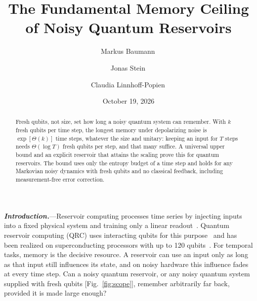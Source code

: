 \documentclass[aps,prl,twocolumn,superscriptaddress,floatfix]{revtex4-2}
\theoremstyle{plain}
\newcommand{\runin}[1]{\textit{\textbf{#1}}---}
\begin{document}
\let\SMaddcontentsline\addcontentsline
\renewcommand{\addcontentsline}[3]{}

\title{The Fundamental Memory Ceiling of Noisy Quantum Reservoirs}

\author{Markus Baumann\,}
\author{Jonas Stein\,}
\author{Claudia Linnhoff-Popien\,}

\date{October 19, 2026}

\begin{abstract}
Fresh qubits, not size, set how long a noisy quantum system can remember. With $k$ fresh qubits per time step, the longest memory under depolarizing noise is $\exp[\Theta(k)]$ time steps, whatever the size and unitary: keeping an input for $T$ steps needs $\Theta(\log T)$ fresh qubits per step, and that many suffice. A universal upper bound and an explicit reservoir that attains the scaling prove this for quantum reservoirs. The bound uses only the entropy budget of a time step and holds for any Markovian noisy dynamics with fresh qubits and no classical feedback, including measurement-free error correction.
\end{abstract}

\maketitle


\runin{Introduction.}Reservoir computing processes time series by injecting inputs into a fixed physical system and training only a linear readout~\cite{Jaeger2001,Maass2002,JaegerHaas2004,Lukosevicius2009,Tanaka2019}. Quantum reservoir computing (QRC) uses interacting qubits for this purpose~\cite{Fujii2017,Nakajima2019,Mujal2021} and has been realized on superconducting processors with up to 120 qubits~\cite{Chen2020,Suzuki2022,Yasuda2023,Hu2024,Monzani2024}. For temporal tasks, memory is the decisive resource. A reservoir can use an input only as long as that input still influences its state, and on noisy hardware this influence fades at every time step. Can a noisy quantum reservoir, or any noisy quantum system supplied with fresh qubits [Fig.~\ref{fig:scope}], remember arbitrarily far back, provided it is made large enough?
\end{document}
